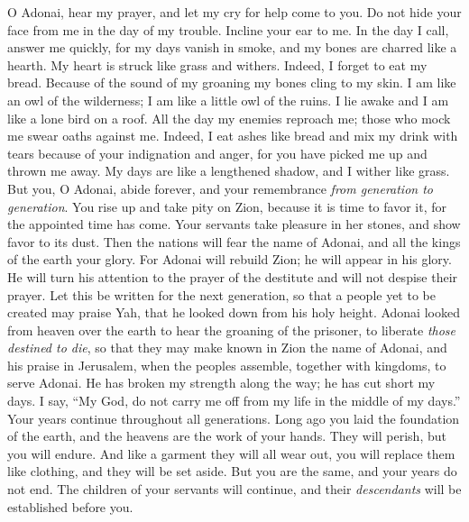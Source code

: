 \begin{biblechapter} %
 O Adonai, hear my prayer, 
and let my cry for help come to you.
\verse Do not hide your face from me 
in the day of my trouble. 
Incline your ear to me. 
In the day I call, answer me quickly,
\verse for my days vanish in smoke, 
and my bones are charred like a hearth.
\verse My heart is struck like grass and withers. 
Indeed, I forget to eat my bread.
\verse Because of the sound of my groaning 
my bones cling to my skin.
\verse I am like an owl of the wilderness; 
I am like a little owl of the ruins.
\verse I lie awake and I am 
like a lone bird on a roof.
\verse All the day my enemies reproach me; 
those who mock me swear oaths against me.
\verse Indeed, I eat ashes like bread 
and mix my drink with tears
\verse because of your indignation and anger, 
for you have picked me up and thrown me away.
\verse My days are like a lengthened shadow, 
and I wither like grass.
\verse But you, O Adonai, abide forever, 
and your remembrance \textit{from generation to generation}.
\verse You rise up and take pity on Zion, 
because it is time to favor it, 
for the appointed time has come.
\verse Your servants take pleasure in her stones, 
and show favor to its dust.
\verse Then the nations will fear the name of Adonai, 
and all the kings of the earth your glory.
\verse For Adonai will rebuild Zion; 
he will appear in his glory.
\verse He will turn his attention to the prayer of the destitute 
and will not despise their prayer.
\verse Let this be written for the next generation, 
so that a people yet to be created may praise Yah,
\verse that he looked down from his holy height. 
Adonai looked from heaven over the earth
\verse to hear the groaning of the prisoner, 
to liberate \textit{those destined to die},
\verse so that they may make known in Zion the name of Adonai, 
and his praise in Jerusalem,
\verse when the peoples assemble, 
together with kingdoms, to serve Adonai.
\verse He has broken my strength along the way; 
he has cut short my days.
\verse I say, “My God, do not carry me off 
from my life in the middle of my days.” 
Your years continue throughout all generations.
\verse Long ago you laid the foundation of the earth, 
and the heavens are the work of your hands.
\verse They will perish, but you will endure. 
And like a garment they will all wear out, 
you will replace them like clothing, and they will be set aside.
\verse But you are the same, 
and your years do not end.
\verse The children of your servants will continue, 
and their \textit{descendants} will be established before you.
\end{biblechapter}

